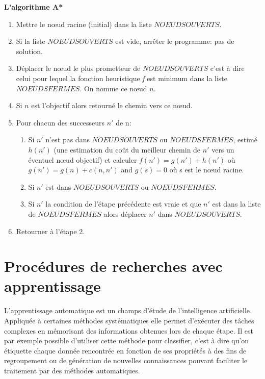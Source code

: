 \textbf{L'algorithme A*\cite{description-a*}}
\begin{enumerate}
\item Mettre le nœud racine (initial) dans la liste $NOEUDS OUVERTS$.
\item Si la liste $NOEUDS OUVERTS$ est vide, arrêter le programme: pas de solution.
\item Déplacer le nœud le plus prometteur de $NOEUDS OUVERTS$ c'est à dire celui pour lequel la fonction heuristique \textit{f} est minimum dans la liste $NOEUDS FERMES$. On nomme ce nœud $n$.
\item Si $n$ est l'objectif alors retourné le chemin vers ce nœud.
\item  Pour chacun des successeurs $n'$ de n:
    \begin{enumerate}
    \item Si $n'$ n'est pas dans $NOEUDS OUVERTS$ ou $NOEUDS FERMES$, estimé $h(n')$ (une estimation du coût du meilleur chemin de $n'$ vers un éventuel nœud objectif) et calculer $f(n') = g(n') + h(n')$ où $g(n') = g(n) + c(n, n')$ and $g(s) = 0$ où s est le nœud racine.
    \item Si $n'$ est dans $NOEUDS OUVERTS$ ou  $NOEUDS FERMES$. 
    \item Si $n'$ la condition de l'étape précédente est vraie et que $n'$ est dans la liste de $NOEUDS FERMES$ alors déplacer $n'$ dans $NOEUDS OUVERTS$.
    \end{enumerate}
\item Retourner à l'étape 2. 
\end{enumerate}



\section{Procédures de recherches avec apprentissage}
L'apprentissage automatique est un champs d'étude de l'intelligence artificielle.
Appliquée à certaines méthodes systématiques elle permet d'exécuter des tâches complexes en mémorisant des informations obtenues lors de chaque étape. Il est par exemple possible d'utiliser cette méthode pour classifier, c'est à dire qu'on étiquette chaque donnée rencontrée en fonction de ses propriétés à des fins de regroupement ou de génération de nouvelles connaissances pouvant faciliter le traitement par des méthodes automatiques. 

